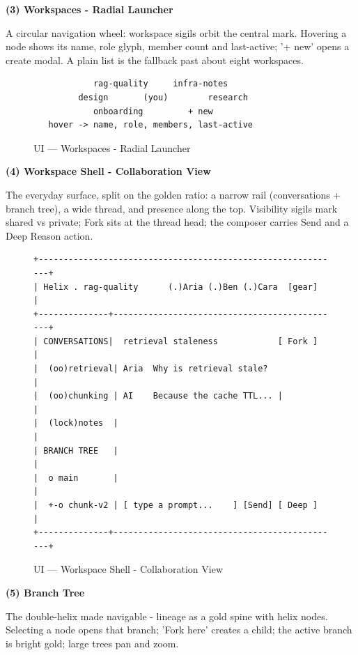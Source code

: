 \documentclass[12pt,a4paper]{report}
\begin{document}
\noindent\textbf{(3) Workspaces - Radial Launcher}

A circular navigation wheel: workspace sigils orbit the central mark. Hovering a node shows its name, role glyph, member count and last-active; '+ new' opens a create modal. A plain list is the fallback past about eight workspaces.

\begin{figure}[H]\centering
\begin{lstlisting}
            rag-quality     infra-notes
         design       (you)        research
            onboarding         + new
   hover -> name, role, members, last-active
\end{lstlisting}
\caption{UI --- Workspaces - Radial Launcher}
\end{figure}

\noindent\textbf{(4) Workspace Shell - Collaboration View}

The everyday surface, split on the golden ratio: a narrow rail (conversations + branch tree), a wide thread, and presence along the top. Visibility sigils mark shared vs private; Fork sits at the thread head; the composer carries Send and a Deep Reason action.

\begin{figure}[H]\centering
\begin{lstlisting}
+-------------------------------------------------------------+
| Helix . rag-quality      (.)Aria (.)Ben (.)Cara  [gear]     |
+--------------+----------------------------------------------+
| CONVERSATIONS|  retrieval staleness            [ Fork ]     |
|  (oo)retrieval| Aria  Why is retrieval stale?               |
|  (oo)chunking | AI    Because the cache TTL... |            |
|  (lock)notes  |                                              |
| BRANCH TREE   |                                              |
|  o main       |                                              |
|  +-o chunk-v2 | [ type a prompt...    ] [Send] [ Deep ]      |
+--------------+----------------------------------------------+
\end{lstlisting}
\caption{UI --- Workspace Shell - Collaboration View}
\end{figure}

\noindent\textbf{(5) Branch Tree}

The double-helix made navigable - lineage as a gold spine with helix nodes. Selecting a node opens that branch; 'Fork here' creates a child; the active branch is bright gold; large trees pan and zoom.
\end{document}
